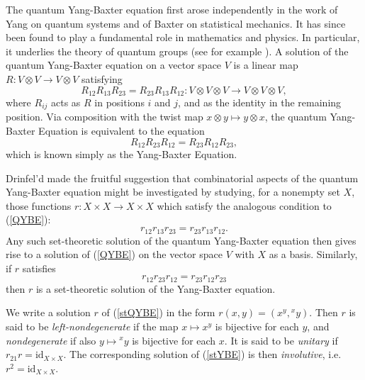 \documentclass[letterpaper,12pt]{amsart}
\numberwithin{equation}{section}
\numberwithin{algorithm}{section}
\theoremstyle{definition}
\newcommand{\id}{\mathrm{id}}
\begin{document}
The quantum Yang-Baxter equation first arose independently in the work of Yang \cite{Yang} on quantum systems and of Baxter \cite{Baxter} on statistical mechanics. It has since been found to play a fundamental role in mathematics and physics. In particular, it underlies the theory of quantum groups (see for example \cite{Majid}). A solution of the quantum Yang-Baxter equation on a vector space $V$ is a linear map $R: V \otimes V \to V \otimes V$ satisfying 
\begin{equation} \label{QYBE}
	 R_{12} R_{13} R_{23} = R_{23} R_{13} R_{12} : V \otimes V \otimes V \to V \otimes V \otimes V, 
\end{equation}
where $R_{ij}$ acts as $R$ in positions $i$ and $j$, and as the identity in the remaining position. Via composition with the twist map $x \otimes y \mapsto y \otimes x$, the quantum Yang-Baxter Equation is equivalent to the equation
\begin{equation} \label{YBE}
	   	R_{12} R_{23} R_{12} = R_{23} R_{12} R_{23},
\end{equation}
which is known simply as the Yang-Baxter Equation.

Drinfel'd \cite{Drinfeld} made the fruitful suggestion that combinatorial aspects of the quantum Yang-Baxter equation might be investigated by studying, for a nonempty set $X$, those functions $r : X \times X \to X \times X$ which satisfy the analogous condition to (\ref{QYBE}):
\begin{equation} \label{stQYBE}
	r_{12} r_{13} r_{23} = r_{23} r_{13} r_{12}.
\end{equation}
Any such set-theoretic solution of the quantum Yang-Baxter equation then gives rise to a solution of (\ref{QYBE}) on the vector space $V$ with $X$ as a basis. Similarly, if $r$ satisfies
\begin{equation} \label{stYBE}
	r_{12} r_{23} r_{12} = r_{23} r_{12} r_{23}
\end{equation}
then $r$ is a set-theoretic solution of the Yang-Baxter equation. 

We write a solution $r$ of (\ref{stQYBE}) in the form
$r(x,y) = (x^y, {}^x y)$. 
Then $r$ is said to be {\em left-nondegenerate} if the map $x \mapsto x^y$ is bijective for each $y$, and {\em nondegenerate} if also $y \mapsto {}^x y$ is bijective for each $x$. It is said to be {\em unitary} if $r_{21} r = \id_{X \times X}$. The corresponding solution of (\ref{stYBE}) is then {\em involutive}, i.e.~~$r^2=\id_{X \times X}$.
\end{document}
